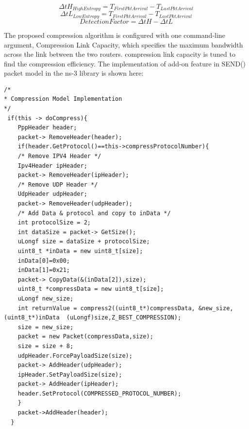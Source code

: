 \documentclass[sigconf]{acmart}
\begin{document}
\begin{displaymath}
	\Delta tH_{HighEntropy}  = T_{FirstPktArrival} - T_{LastPktArrival} 
\end{displaymath}
\begin{displaymath}
	\Delta tL_{LowEntropy}  = T_{FirstPktArrival} - T_{LastPktArrival} 
\end{displaymath}
\begin{equation}
 	DetectionFactor = \Delta tH - \Delta tL
\end{equation}
\label{delta}


The proposed compression algorithm is configured with one command-line argument, Compression Link Capacity, which specifies the maximum bandwidth across the link between the two routers. compression link capacity is tuned to find the compression efficiency. The implementation of add-on feature in SEND() packet model in the ns-3 library is shown here:

 \begin{lstlisting}
/*
* Compression Model Implementation
*/
 if(this -> doCompress){   
    PppHeader header;
    packet-> RemoveHeader(header);
    if(header.GetProtocol()==this->compressProtocolNumber){      
    /* Remove IPV4 Header */
    Ipv4Header ipHeader;
    packet-> RemoveHeader(ipHeader);
    /* Remove UDP Header */
    UdpHeader udpHeader;
    packet-> RemoveHeader(udpHeader);
    /* Add Data & protocol and copy to inData */
    int protocolSize = 2;
    int dataSize = packet-> GetSize();
    uLongf size = dataSize + protocolSize; 
    uint8_t *inData = new uint8_t[size];
    inData[0]=0x00; 
    inData[1]=0x21;
    packet-> CopyData(&(inData[2]),size);
    uint8_t *compressData = new uint8_t[size];
    uLongf new_size;
    int returnValue = compress2((uint8_t*)compressData, &new_size, (uint8_t*)inData  (uLongf)size,Z_BEST_COMPRESSION);     
    size = new_size;
    packet = new Packet(compressData,size); 
    size = size + 8; 
    udpHeader.ForcePayloadSize(size);
    packet-> AddHeader(udpHeader);
    ipHeader.SetPayloadSize(size); 
    packet-> AddHeader(ipHeader);
    header.SetProtocol(COMPRESSED_PROTOCOL_NUMBER); 
    } 
    packet->AddHeader(header);
  } 

\end{lstlisting}
\end{document}

